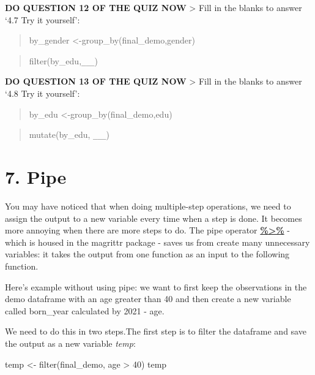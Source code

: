 \documentclass[
]{book}
\newenvironment{Shaded}{\begin{snugshade}}{\end{snugshade}}
\newcommand{\DecValTok}[1]{\textcolor[rgb]{0.00,0.00,0.81}{#1}}
\newcommand{\FunctionTok}[1]{\textcolor[rgb]{0.00,0.00,0.00}{#1}}
\newcommand{\NormalTok}[1]{#1}
\newcommand{\OtherTok}[1]{\textcolor[rgb]{0.56,0.35,0.01}{#1}}
\newcommand{\SpecialCharTok}[1]{\textcolor[rgb]{0.00,0.00,0.00}{#1}}
\begin{document}
\textbf{DO QUESTION 12 OF THE QUIZ NOW}
\textgreater{} Fill in the blanks to answer `4.7 Try it yourself':

\begin{quote}
by\_gender \textless-group\_by(final\_demo,gender)
\end{quote}

\begin{quote}
filter(by\_edu,\texttt{\_\_\_})
\end{quote}

\textbf{DO QUESTION 13 OF THE QUIZ NOW}
\textgreater{} Fill in the blanks to answer `4.8 Try it yourself':

\begin{quote}
by\_edu \textless-group\_by(final\_demo,edu)
\end{quote}

\begin{quote}
mutate(by\_edu, \texttt{\_\_\_})
\end{quote}

\hypertarget{pipe}{%
\section{7. Pipe}\label{pipe}}

You may have noticed that when doing multiple-step operations, we need to assign the output to a new variable every time when a step is done. It becomes more annoying when there are more steps to do. The pipe operator \href{https://www.rdocumentation.org/packages/magrittr/versions/2.0.1/topics/magrittr-package}{\textbf{\%\textgreater\%}} - which is housed in the magrittr package - saves us from create many unnecessary variables: it takes the output from one function as an input to the following function.

Here's example without using pipe: we want to first keep the observations in the demo dataframe with an age greater than 40 and then create a new variable called born\_year calculated by 2021 - age.

We need to do this in two steps.The first step is to filter the dataframe and save the output as a new variable \emph{temp}:

\begin{Shaded}
\begin{Highlighting}[]
\NormalTok{temp }\OtherTok{\textless{}{-}} \FunctionTok{filter}\NormalTok{(final\_demo, age }\SpecialCharTok{\textgreater{}} \DecValTok{40}\NormalTok{)}
\NormalTok{temp}
\end{Highlighting}
\end{Shaded}
\end{document}
